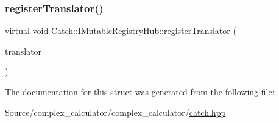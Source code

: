 \mbox{\label{struct_catch_1_1_i_mutable_registry_hub_ae6825365102693cf7707db022a2c2b49}} 
\subsubsection{\texorpdfstring{register\+Translator()}{registerTranslator()}}
{\footnotesize\ttfamily virtual void Catch\+::\+I\+Mutable\+Registry\+Hub\+::register\+Translator (\begin{DoxyParamCaption}\item[{const \mbox{\hyperlink{struct_catch_1_1_i_exception_translator}{I\+Exception\+Translator}} $\ast$}]{translator }\end{DoxyParamCaption})\hspace{0.3cm}{\ttfamily [pure virtual]}}



The documentation for this struct was generated from the following file\+:\begin{DoxyCompactItemize}
\item 
Source/complex\+\_\+calculator/complex\+\_\+calculator/\mbox{\hyperlink{catch_8hpp}{catch.\+hpp}}\end{DoxyCompactItemize}
